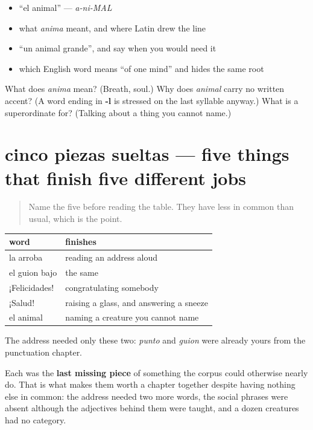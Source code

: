 \begin{itemize}
\raggedright
  \item \textquotedblleft{}el animal\textquotedblright{} — \emph{a-ni-MAL}
  \item what \emph{anima} meant, and where Latin drew the line
  \item \textquotedblleft{}un animal grande\textquotedblright{}, and say when you would need it
  \item which English word means \textquotedblleft{}of one mind\textquotedblright{} and hides the same root
\end{itemize}

\begin{tcolorbox}[breakable,colback=teal!4,colframe=teal!35!black,title={Before you move on}]
What does \emph{anima} mean? (Breath, soul.) Why does \emph{animal} carry no written accent? (A word ending in \textbf{-l} is stressed on the last syllable anyway.) What is a superordinate for? (Talking about a thing you cannot name.)
\end{tcolorbox}
\section[cinco piezas sueltas]{cinco piezas sueltas — five things that finish five different jobs}

\label{lesson:ES-C428-repaso-cortesia}



\begin{quote}
Name the five before reading the table. They have less in common than usual, which is the point.
\end{quote}

\begin{grammarlens}[title={Grammar Lens: what each one completes}]
\noindent
\begin{tabularx}{\linewidth}{@{}>{\raggedright\arraybackslash}X>{\raggedright\arraybackslash}X@{}}
\toprule
\textbf{word} & \textbf{finishes} \\
\midrule
la arroba & reading an address aloud \\
el guion bajo & the same \\
¡Felicidades! & congratulating somebody \\
¡Salud! & raising a glass, and answering a sneeze \\
el animal & naming a creature you cannot name \\
\bottomrule
\end{tabularx}

The address needed only these two: \emph{punto} and \emph{guion} were already yours from the punctuation chapter.

Each was the \textbf{last missing piece} of something the corpus could otherwise nearly do. That is what makes them worth a chapter together despite having nothing else in common: the address needed two more words, the social phrases were absent although the adjectives behind them were taught, and a dozen creatures had no category.
\end{grammarlens}

